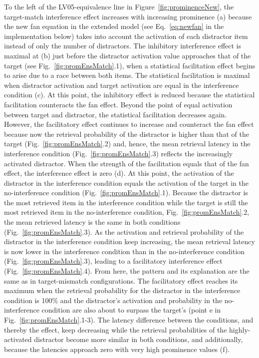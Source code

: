 \documentclass{cambridge7A}\usepackage[]{graphicx}\usepackage[]{color}
\begin{document}
To the left of the LV05-equivalence line in Figure~\ref{fig:prominenceNew}, the target-match interference effect increases with increasing prominence (a) because the new fan equation in the extended model (see Eq.~\ref{eq:newfan} in the implementation below) takes into account the activation of each distractor item instead of only the number of distractors.
The inhibitory interference effect is maximal at (b) just before the distractor activation value approaches that of the target (see Fig.~\ref{fig:promEnsMatch}.1), when a statistical facilitation effect begins to arise due to a race between both items. The statistical facilitation is maximal when distractor activation and target activation are equal in the interference condition (c). At this point, the inhibitory effect is reduced because the statistical facilitation counteracts the fan effect. 
Beyond the point of equal activation between target and distractor, the statistical facilitation decreases again. However, the facilitatory effect continues to increase and counteract the  fan effect because now the retrieval probability of the distractor is higher than that of the target (Fig.~\ref{fig:promEnsMatch}.2) and, hence, the mean retrieval latency in the interference condition (Fig.~\ref{fig:promEnsMatch}.3) reflects the increasingly activated distractor. 
When the strength of the facilitation equals that of the fan effect, the interference effect is zero (d). At this point, the activation of the distractor in the interference condition equals the activation of the target in the no-interference condition (Fig.~\ref{fig:promEnsMatch}.1). Because the distractor is the most retrieved item in the interference condition while the target is still the most retrieved item in the no-interference condition, Fig.~\ref{fig:promEnsMatch}.2, the mean retrieved latency is the same in both conditions (Fig.~\ref{fig:promEnsMatch}.3).
As the activation and retrieval probability of the distractor in the interference condition keep increasing, the mean retrieval latency is now lower in the interference condition than in the no-interference condition (Fig.~\ref{fig:promEnsMatch}.3), leading to a facilitatory interference effect (Fig.~\ref{fig:promEnsMatch}.4). 
From here, the pattern and its explanation are the same as in target-mismatch configurations. The facilitatory effect reaches its maximum when the retrieval probability for the distractor in the interference condition is 100\% and the distractor's activation and probability in the no-interference condition are also about to surpass the target's (point e in Fig.~\ref{fig:promEnsMatch}.1-3). The latency difference between the conditions, and thereby the effect, keep decreasing while the retrieval probabilities of the highly-activated distractor become more similar in both conditions, and additionally, because the latencies approach zero with very high prominence values (f).
\end{document}
